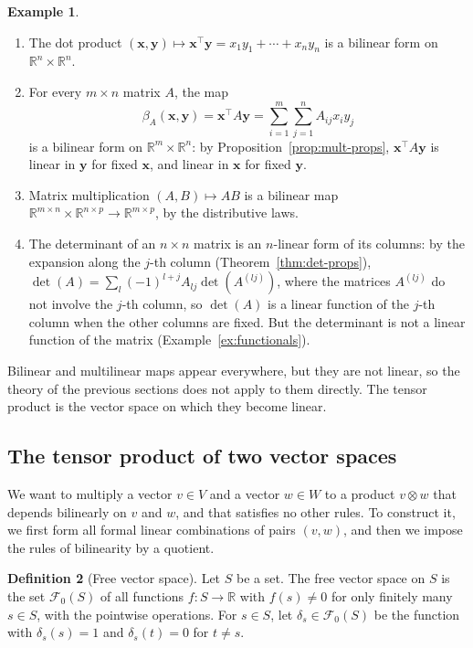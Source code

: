 \documentclass[11pt]{article}
\theoremstyle{definition}
\newtheorem{definition}{Definition}[section]
\newtheorem{example}[definition]{Example}
\theoremstyle{plain}
\theoremstyle{remark}
\begin{document}
\begin{example}\label{ex:multilinear}
    \begin{enumerate}
        \item The dot product $(\mathbf{x}, \mathbf{y}) \mapsto \mathbf{x}^\top \mathbf{y} = x_1y_1 + \cdots + x_ny_n$ is a bilinear form on $\mathbb{R}^n \times \mathbb{R}^n$.
        \item For every $m \times n$ matrix $A$, the map
        \[\beta_A(\mathbf{x}, \mathbf{y}) = \mathbf{x}^\top A \mathbf{y} = \sum_{i=1}^m \sum_{j=1}^n A_{ij}x_iy_j\]
        is a bilinear form on $\mathbb{R}^m \times \mathbb{R}^n$: by Proposition~\ref{prop:mult-props}, $\mathbf{x}^\top A\mathbf{y}$ is linear in $\mathbf{y}$ for fixed $\mathbf{x}$, and linear in $\mathbf{x}$ for fixed $\mathbf{y}$.
        \item Matrix multiplication $(A, B) \mapsto AB$ is a bilinear map $\mathbb{R}^{m \times n} \times \mathbb{R}^{n \times p} \to \mathbb{R}^{m \times p}$, by the distributive laws.
        \item The determinant of an $n \times n$ matrix is an $n$-linear form of its columns: by the expansion along the $j$-th column (Theorem~\ref{thm:det-props}), $\det(A) = \sum_l (-1)^{l+j} A_{lj}\det(A^{(lj)})$, where the matrices $A^{(lj)}$ do not involve the $j$-th column, so $\det(A)$ is a linear function of the $j$-th column when the other columns are fixed. But the determinant is not a linear function of the matrix (Example~\ref{ex:functionals}).
    \end{enumerate}
\end{example}

Bilinear and multilinear maps appear everywhere, but they are not linear, so the theory of the previous sections does not apply to them directly. The tensor product is the vector space on which they become linear.

\subsection{The tensor product of two vector spaces}

We want to multiply a vector $v \in V$ and a vector $w \in W$ to a product $v \otimes w$ that depends bilinearly on $v$ and $w$, and that satisfies no other rules. To construct it, we first form all formal linear combinations of pairs $(v, w)$, and then we impose the rules of bilinearity by a quotient.

\begin{definition}[Free vector space]\label{def:free}
    Let $S$ be a set. The free vector space on $S$ is the set $\mathcal{F}_0(S)$ of all functions $f: S \to \mathbb{R}$ with $f(s) \neq 0$ for only finitely many $s \in S$, with the pointwise operations. For $s \in S$, let $\delta_s \in \mathcal{F}_0(S)$ be the function with $\delta_s(s) = 1$ and $\delta_s(t) = 0$ for $t \neq s$.
\end{definition}
\end{document}
